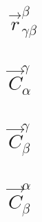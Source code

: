 \documentclass[12pt,letterpaper, onecolumn]{exam}
\begin{document}
\begin{questions}
{\begin{parts}
            \part{$\vec{r}^{\beta}_{\gamma\beta}$}
            \part{$\vec{C}^{\gamma}_{\alpha}$}
            \part{$\vec{C}^{\gamma}_{\beta}$}
            \part{$\vec{C}^{\alpha}_{\beta}$}
        \end{parts}
    }

\end{questions}
\end{document}
